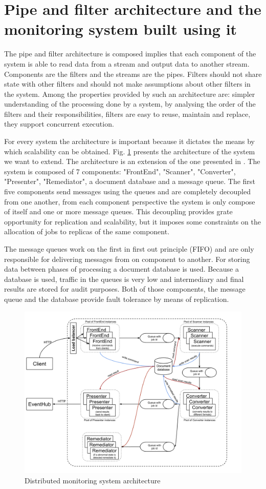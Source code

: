\section{Pipe and filter architecture and the monitoring system built using it}
\label{sec:architecture}
The pipe and filter architecture is composed implies that each component of the system is able to read data from a stream and output data to another stream. Components are the filters and the streams are the pipes. Filters should not share state with other filters and should not make assumptions about other filters in the system. Among the properties provided by such an architecture are: simpler understanding of the processing done by a system, by analysing the order of the filters and their responsibilities, filters are easy to reuse, maintain and replace, they support concurrent execution.

For every system the architecture is important because it dictates the means by which scalability can be obtained. Fig. \ref{fig:systemArchitecture} presents the architecture of the system we want to extend. The architecture is an extension of the one presented in \cite{IrimieAndPetcu}. The system is composed of 7 components: "FrontEnd", "Scanner", "Converter", "Presenter", "Remediator", a document database and a message queue. The first five components send messages using the queues and are completely decoupled from one another, from each component perspective the system is only compose of itself and one or more message queues. This decoupling provides grate opportunity for replication and scalability, but it imposes some constraints on the allocation of jobs to replicas of the same component. 

The message queues work on the first in first out principle (FIFO) and are only responsible for delivering messages from on component to another. For storing data between phases of processing a document database is used. 
Because a database is used, traffic in the queues is very low and intermediary and final results are stored for audit purposes. Both of those components, the message queue and the database provide fault tolerance by means of replication.


\begin{figure}[ht]
\centering
\includegraphics[width=\linewidth]{./img/MonitoringSystemArchitectureRemediation.png}
\caption{Distributed monitoring system architecture}
\label{fig:systemArchitecture}
\end{figure}


